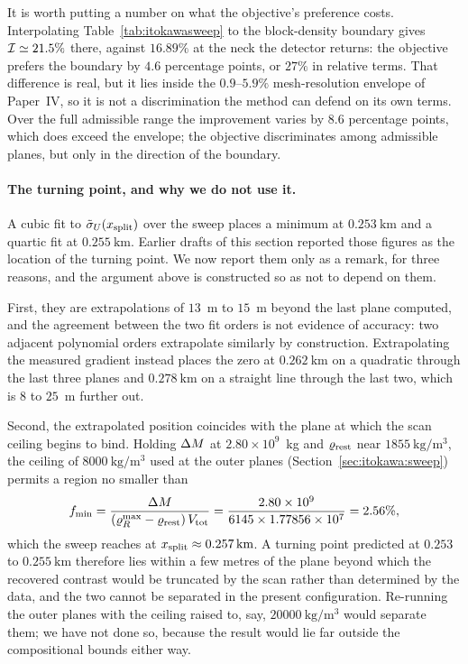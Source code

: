It is worth putting a number on what the objective's preference costs.
Interpolating Table~\ref{tab:itokawasweep} to the block-density boundary
gives $\mathcal{I} \simeq 21.5\%$ there, against $16.89\%$ at the neck the
detector returns: the objective prefers the boundary by $4.6$ percentage
points, or $27\%$ in relative terms. That difference is real, but it lies
inside the $0.9$--$5.9\%$ mesh-resolution envelope of Paper~IV, so it is not
a discrimination the method can defend on its own terms. Over the full
admissible range the improvement varies by $8.6$ percentage points, which
does exceed the envelope; the objective discriminates among admissible
planes, but only in the direction of the boundary.

\paragraph{The turning point, and why we do not use it.}
A cubic fit to $\tilde{\sigma}_{U}(x_{\mathrm{split}})$ over the sweep places a minimum at
$\SI{0.253}{\kilo\metre}$ and a quartic fit at $\SI{0.255}{\kilo\metre}$.
Earlier drafts of this section reported those figures as the location of the
turning point. We now report them only as a remark, for three reasons, and
the argument above is constructed so as not to depend on them.

First, they are extrapolations of $13$~m to $15$~m beyond the last plane
computed, and the agreement between the two fit orders is not evidence of
accuracy: two adjacent polynomial orders extrapolate similarly by
construction. Extrapolating the measured gradient instead places the zero at
$\SI{0.262}{\kilo\metre}$ on a quadratic through the last three planes and
$\SI{0.278}{\kilo\metre}$ on a straight line through the last two, which is
$8$ to $25$~m further out.

Second, the extrapolated position coincides with the plane at which the scan
ceiling begins to bind. Holding $\Delta M$ at $2.80\times10^{9}$~kg and
$\varrho_{\mathrm{rest}}$ near $\SI{1855}{\kilo\gram\per\cubic\metre}$, the ceiling of
$\SI{8000}{\kilo\gram\per\cubic\metre}$ used at the outer planes
(Section~\ref{sec:itokawa:sweep}) permits a region no smaller than
%
\begin{equation}
f_{\min} = \frac{\Delta M}{(\varrho_{R}^{\max}-\varrho_{\mathrm{rest}})\,V_{\mathrm{tot}}}
         = \frac{2.80\times10^{9}}
                {6145 \times 1.77856\times10^{7}}
         = 2.56\% ,
\label{eq:capbinds}
\end{equation}
%
which the sweep reaches at $x_{\mathrm{split}} \approx \SI{0.257}{\kilo\metre}$. A
turning point predicted at $0.253$ to $\SI{0.255}{\kilo\metre}$ therefore
lies within a few metres of the plane beyond which the recovered contrast
would be truncated by the scan rather than determined by the data, and the
two cannot be separated in the present configuration. Re-running the outer
planes with the ceiling raised to, say,
$\SI{20000}{\kilo\gram\per\cubic\metre}$ would separate them; we have not
done so, because the result would lie far outside the compositional bounds
either way.

